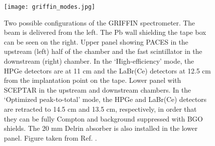 \documentclass[cnatzke_thesis_proposal.tex]{subfiles}
\begin{document}
\begin{center}
  \begin{figure}[H]
    \begin{center}
      \texttt{[image: griffin\_modes.jpg]}
    \end{center}
    \caption{Two possible configurations of the GRIFFIN spectrometer. The beam is delivered from the left. The Pb wall shielding the tape box can be seen on the right. Upper panel showing PACES in the upstream (left) half of the chamber and the fast scintillator in the downstream (right) chamber. In the ‘High-efficiency’ mode, the HPGe detectors are at 11 cm and the LaBr(Ce) detectors at 12.5 cm from the implantation point on the tape. Lower panel with SCEPTAR in the upstream and downstream chambers. In the ‘Optimized peak-to-total’ mode, the HPGe and LaBr(Ce) detectors are retracted to 14.5 cm and 13.5 cm, respectively, in order that they can be fully Compton and background suppressed with BGO shields. The 20 mm Delrin absorber is also installed in the lower panel. Figure taken from Ref. \cite{garnsworthy_griffin_2019}.}
    \label{fig:griffin_modes}
  \end{figure}
\end{center}


\end{document}
